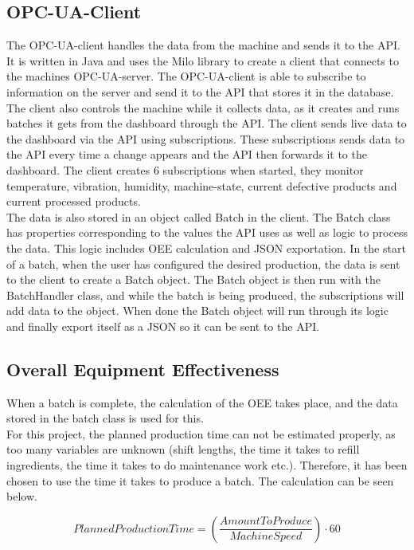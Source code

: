 \subsection{OPC-UA-Client}
The OPC-UA-client handles the data from the machine and sends it to the API. It 
is written in Java and uses the Milo library to create a client that connects to 
the machines OPC-UA-server. The OPC-UA-client is able to subscribe to 
information on the server and send it to the API that stores it in the database.
The client also controls the machine while it collects data, as it creates and
runs batches it gets from the dashboard through the API. The client sends live
data to the dashboard via the API using subscriptions. These subscriptions sends
data to the API every time a change appears and the API then forwards it to the
dashboard. The client creates 6 subscriptions when started, they monitor
temperature, vibration, humidity, machine-state,  current defective products and
current processed products. \\

The data is also stored in an object called Batch in the client. The Batch class
has properties corresponding to the values the API uses as well as logic to
process the data. This logic includes OEE calculation and JSON exportation. In
the start of a batch, when the user has configured the desired production, the
data is sent to the client to create a Batch object. The Batch object is then
run with the BatchHandler class, and while the batch is being produced, the
subscriptions will add data to the object. When done the Batch object will run
through its logic and finally export itself as a JSON so it can be sent to the
API. 


\subsection{Overall Equipment Effectiveness}
When a batch is complete, the calculation of the OEE takes place, and the data
stored in the batch class is used for this.\\

For this project, the planned production time can not be estimated properly, as
too many variables are unknown (shift lengths, the time it takes to refill
ingredients, the time it takes to do maintenance work etc.). Therefore, it has
been chosen to use the time it takes to produce a batch. The calculation can be
seen below.

\[PlannedProductionTime = \left(\frac{AmountToProduce}{MachineSpeed}\right)\cdot60\]\\


